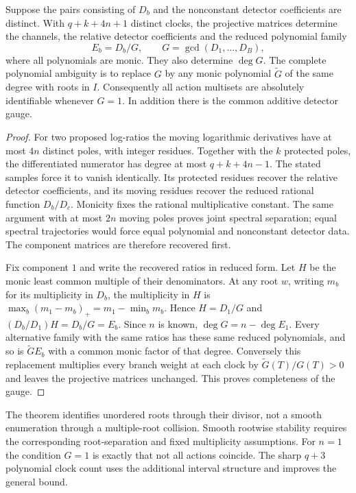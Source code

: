 \begin{theorem}\label{thm:v84-divisors}
Suppose the pairs consisting of $D_b$ and the nonconstant detector
coefficients are distinct. With $q+k+4n+1$ distinct clocks, the
projective matrices determine the channels, the relative detector
coefficients and the reduced polynomial family
\[
 E_b=D_b/G,\qquad G=\gcd(D_1,\ldots,D_B),
\]
where all polynomials are monic. They also determine $\deg G$.
The complete polynomial ambiguity is to replace $G$ by any monic
polynomial $\widetilde G$ of the same degree with roots in $I$.
Consequently all action multisets are absolutely identifiable whenever
$G=1$. In addition there is the common additive detector gauge.
\end{theorem}
\begin{proof}
For two proposed log-ratios the moving logarithmic derivatives have
at most $4n$ distinct poles, with integer residues. Together with the
$k$ protected poles, the differentiated numerator has degree at most
$q+k+4n-1$. The stated samples force it to vanish identically. Its
protected residues recover the relative detector coefficients, and its
moving residues recover the reduced rational function $D_b/D_c$.
Monicity fixes the rational multiplicative constant. The same argument
with at most $2n$ moving poles proves joint spectral separation; equal
spectral trajectories would force equal polynomial and nonconstant
detector data. The component matrices are therefore recovered first.

Fix component $1$ and write the recovered ratios in reduced form.
Let $H$ be the monic least common multiple of their denominators.
At any root $w$, writing $m_b$ for its multiplicity in $D_b$, the
multiplicity in $H$ is
$\max_b(m_1-m_b)_+=m_1-\min_bm_b$. Hence $H=D_1/G$ and
$(D_b/D_1)H=D_b/G=E_b$. Since $n$ is known, $\deg G=n-\deg E_1$.
Every alternative family with the same ratios has these same reduced
polynomials, and so is $\widetilde G E_b$ with a common monic factor
of that degree. Conversely this replacement multiplies every branch
weight at each clock by $\widetilde G(T)/G(T)>0$ and leaves the
projective matrices unchanged. This proves completeness of the gauge.
\end{proof}
The theorem identifies unordered roots through their divisor, not a
smooth enumeration through a multiple-root collision. Smooth rootwise
stability requires the corresponding root-separation and fixed
multiplicity assumptions. For $n=1$ the condition $G=1$ is exactly
that not all actions coincide. The sharp $q+3$ polynomial clock count
uses the additional interval structure and improves the general bound.
